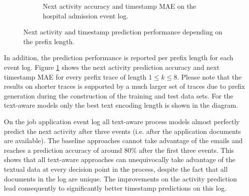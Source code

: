 \begin{figure}[!htbp]
\begin{subfigure}{\textwidth}
		\caption{Next activity accuracy and timestamp MAE on the hospital admission event log.}
	\end{subfigure}
	\caption[Next activity and timestamp prediction performance depending on the prefix length]{Next activity and timestamp prediction performance depending on the prefix length.}
	\label{fig:next-activity-prefix}
\end{figure}

In addition, the prediction performance is reported per prefix length for each event log.
Figure \ref{fig:next-activity-prefix} shows the next activity prediction accuracy and next timestamp MAE for every prefix trace of length $1 \leq k \leq 8$.
Please note that the results on shorter traces is supported by a much larger set of traces due to prefix generation during the construction of the training and test data sets.
For the text-aware models only the best text encoding length is shown in the diagram.

On the job application event log all text-aware process models almost perfectly predict the next activity after three events (i.e. after the application documents are available).
The baseline approaches cannot take advantage of the emails and reaches a prediction accuracy of around 80\% after the first three events.
This shows that all text-aware approaches can unequivocally take advantage of the textual data at every decision point in the process, despite the fact that all documents in the log are unique.
The improvements on the activity prediction lead consequently to significantly better timestamp predictions on this log.

